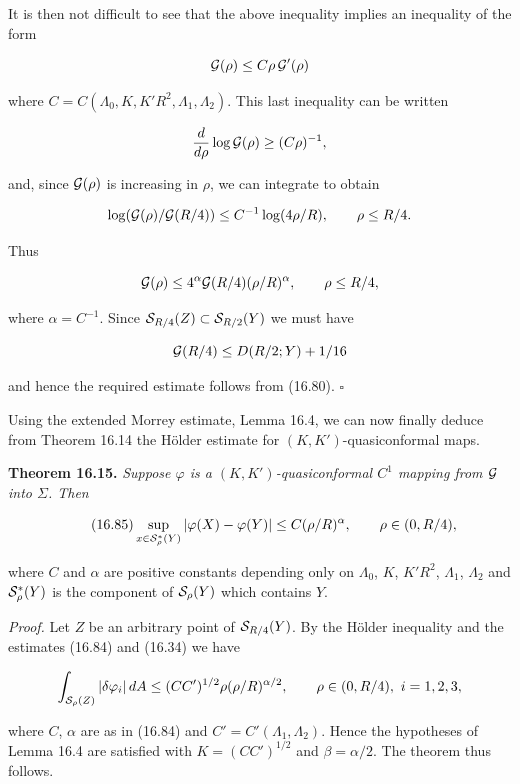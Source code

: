 It is then not difficult to see that the above inequality implies an inequality of the form

\[
\mathcal{G}(\rho)\leq C\rho\,\mathcal{G}'(\rho)
\]

where $C=C(\Lambda_0,K,K'R^2,\Lambda_1,\Lambda_2)$. This last inequality can be written

\[
\frac{d}{d\rho}\log \mathcal{G}(\rho)\geq (C\rho)^{-1},
\]

and, since $\mathcal{G}(\rho)$ is increasing in $\rho$, we can integrate to obtain

\[
\log(\mathcal{G}(\rho)/\mathcal{G}(R/4))\leq C^{-1}\log(4\rho/R),\qquad \rho\leq R/4.
\]

Thus

\[
\mathcal{G}(\rho)\leq 4^\alpha \mathcal{G}(R/4)(\rho/R)^\alpha,\qquad \rho\leq R/4,
\]

where $\alpha=C^{-1}$. Since $\mathcal{S}_{R/4}(Z)\subset\mathcal{S}_{R/2}(Y)$ we must have

\[
\mathcal{G}(R/4)\leq D(R/2;Y)+1/16
\]

and hence the required estimate follows from (16.80). $\square$

Using the extended Morrey estimate, Lemma 16.4, we can now finally deduce
from Theorem 16.14 the H\"older estimate for $(K,K')$-quasiconformal maps.

\medskip

\noindent\textbf{Theorem 16.15.} \textit{Suppose $\varphi$ is a $(K,K')$-quasiconformal $C^1$ mapping from $\mathcal{G}$ into $\Sigma$. Then}

\begin{equation}\tag{16.85}
\sup_{x\in \mathcal{S}_\rho^\ast(Y)} |\varphi(X)-\varphi(Y)|\leq C(\rho/R)^\alpha,\qquad \rho\in(0,R/4),
\end{equation}






where $C$ and $\alpha$ are positive constants depending only on $\Lambda_0$, $K$, $K'R^2$, $\Lambda_1$, $\Lambda_2$ and $\mathcal{S}_\rho^*(Y)$ is the component of $\mathcal{S}_\rho(Y)$ which contains $Y$.

\noindent\textit{Proof.} Let $Z$ be an arbitrary point of $\mathcal{S}_{R/4}(Y)$. By the H\"older inequality and the estimates (16.84) and (16.34) we have

\[
\int_{\Sg_\rho(Z)} |\delta \varphi_i| \, dA \le (CC')^{1/2}\rho (\rho/R)^{\alpha/2}, \qquad \rho \in (0, R/4),\ i=1,2,3,
\]

\noindent where $C$, $\alpha$ are as in (16.84) and $C' = C'( \Lambda_1, \Lambda_2)$. Hence the hypotheses of Lemma 16.4 are satisfied with $K = (CC')^{1/2}$ and $\beta = \alpha/2$. The theorem thus follows.

